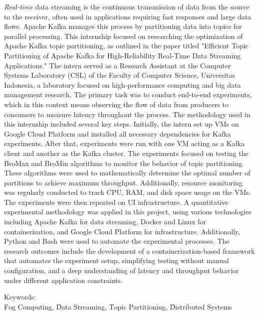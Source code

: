 \noindent \textit{Real-time} data streaming is the continuous transmission of data from the source to the receiver, often used in applications requiring fast responses and large data flows. Apache Kafka manages this process by partitioning data into topics for parallel processing. This internship focused on researching the optimization of Apache Kafka topic partitioning, as outlined in the paper titled "Efficient Topic Partitioning of Apache Kafka for High-Reliability Real-Time Data Streaming Applications." The intern served as a Research Assistant at the Computer Systems Laboratory (CSL) of the Faculty of Computer Science, Universitas Indonesia, a laboratory focused on high-performance computing and big data management research. The primary task was to conduct end-to-end experiments, which in this context means observing the flow of data from producers to consumers to measure latency throughout the process. The methodology used in this internship included several key steps. Initially, the intern set up VMs on Google Cloud Platform and installed all necessary dependencies for Kafka experiments. After that, experiments were run with one VM acting as a Kafka client and another as the Kafka cluster. The experiments focused on testing the BroMax and BroMin algorithms to monitor the behavior of topic partitioning. These algorithms were used to mathematically determine the optimal number of partitions to achieve maximum throughput. Additionally, resource monitoring was regularly conducted to track CPU, RAM, and disk space usage on the VMs. The experiments were then repeated on UI infrastructure. A quantitative experimental methodology was applied in this project, using various technologies including Apache Kafka for data streaming, Docker and Linux for containerization, and Google Cloud Platform for infrastructure. Additionally, Python and Bash were used to automate the experimental processes. The research outcomes include the development of a containerization-based framework that automates the experiment setup, simplifying testing without manual configuration, and a deep understanding of latency and throughput behavior under different application constraints. \\

\vspace*{0.2cm}

\noindent Keywords: \\ \f{Fog Computing}, \f{Data Streaming}, \f{Topic Partitioning}, \f{Distributed Systems} \\

\newpage
